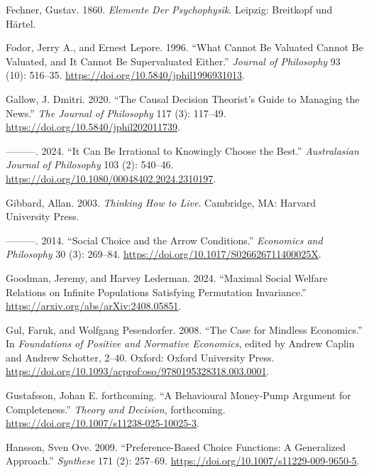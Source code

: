 \documentclass[
  10.5pt,
  twoside]{article}
\newlength{\cslhangindent}
\newenvironment{CSLReferences}[2] %
 {\begin{list}{}{%
  \setlength{\itemindent}{0pt}
  \setlength{\leftmargin}{0pt}
  \setlength{\parsep}{0pt}
  \ifodd #1
   \setlength{\leftmargin}{\cslhangindent}
   \setlength{\itemindent}{-1\cslhangindent}
  \fi
  \setlength{\itemsep}{#2\baselineskip}}}
 {\end{list}}
\begin{document}
\begin{CSLReferences}{1}{0}
Fechner, Gustav. 1860. \emph{Elemente Der Psychophysik}. Leipzig:
Breitkopf und H{ä}rtel.

Fodor, Jerry A., and Ernest Lepore. 1996. {``What Cannot Be Valuated
Cannot Be Valuated, and It Cannot Be Supervaluated Either.''}
\emph{Journal of Philosophy} 93 (10): 516--35.
\url{https://doi.org/10.5840/jphil1996931013}.

Gallow, J. Dmitri. 2020. {``The Causal Decision Theorist's Guide to
Managing the News.''} \emph{The Journal of Philosophy} 117 (3): 117--49.
\url{https://doi.org/10.5840/jphil202011739}.

---------. 2024. {``It Can Be Irrational to Knowingly Choose the
Best.''} \emph{Australasian Journal of Philosophy} 103 (2): 540--46.
\url{https://doi.org/10.1080/00048402.2024.2310197}.

Gibbard, Allan. 2003. \emph{Thinking How to Live}. Cambridge, MA:
Harvard University Press.

---------. 2014. {``Social Choice and the Arrow Conditions.''}
\emph{Economics and Philosophy} 30 (3): 269--84.
\url{https://doi.org/10.1017/S026626711400025X}.

Goodman, Jeremy, and Harvey Lederman. 2024. {``Maximal Social Welfare
Relations on Infinite Populations Satisfying Permutation Invariance.''}
\url{https://arxiv.org/abs/arXiv:2408.05851}.

Gul, Faruk, and Wolfgang Pesendorfer. 2008. {``The Case for Mindless
Economics.''} In \emph{Foundations of Positive and Normative Economics},
edited by Andrew Caplin and Andrew Schotter, 2--40. Oxford: Oxford
University Press.
\url{https://doi.org/10.1093/acprof:oso/9780195328318.003.0001}.

Gustafsson, Johan E. forthcoming. {``A Behavioural Money-Pump Argument
for Completeness.''} \emph{Theory and Decision}, forthcoming.
\url{https://doi.org/10.1007/s11238-025-10025-3}.

Hansson, Sven Ove. 2009. {``Preference-Based Choice Functions: A
Generalized Approach.''} \emph{Synthese} 171 (2): 257--69.
\url{https://doi.org/10.1007/s11229-009-9650-5}.


\end{CSLReferences}
\end{document}

